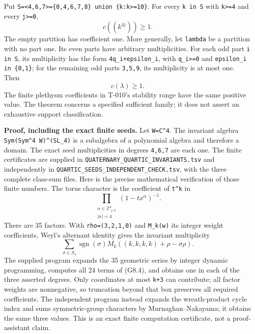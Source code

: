 \documentclass[
  10pt,
]{article}
\begin{document}
Put
\texttt{\small S=\allowbreak{}<4,\allowbreak{}6,\allowbreak{}7>=\allowbreak{}\{0,\allowbreak{}4,\allowbreak{}6,\allowbreak{}7,\allowbreak{}8\} union \{k:\allowbreak{}k>=\allowbreak{}10\}}.
For every \texttt{\small k in S} with \texttt{\small k>=\allowbreak{}4}
and every \texttt{\small j>=\allowbreak{}0}, \[
\boxed{c((k^{4j}))\ge1.}
\tag{G8.1}
\] The empty partition has coefficient one. More generally, let
\texttt{\small lambda} be a partition with no part one. Its even parts
have arbitrary multiplicities. For each odd part \texttt{\small i in S},
its multiplicity has the form
\texttt{\small 4q\_\allowbreak{}i+\allowbreak{}epsilon\_\allowbreak{}i},
with \texttt{\small q\_\allowbreak{}i>=\allowbreak{}0} and
\texttt{\small epsilon\_\allowbreak{}i in \{0,\allowbreak{}1\}}; for the
remaining odd parts \texttt{\small 3,\allowbreak{}5,\allowbreak{}9}, its
multiplicity is at most one. Then \[
\boxed{c(\lambda)\ge1.}
\tag{G8.2}
\] The finite plethysm coefficients in T-010's stability range have the
same positive value. The theorem concerns a specified sufficient family;
it does not assert an exhaustive support classification.

\textbf{Proof, including the exact finite seeds.} Let
\texttt{\small W=\allowbreak{}C\textasciicircum{}4}. The invariant
algebra
\texttt{\small Sym(\allowbreak{}Sym\textasciicircum{}4 W)\allowbreak{}\textasciicircum{}(\allowbreak{}SL\_\allowbreak{}4)\allowbreak{}}
is a subalgebra of a polynomial algebra and therefore a domain. The
exact seed multiplicities in degrees
\texttt{\small 4,\allowbreak{}6,\allowbreak{}7} are each one. The finite
certificates are supplied in
\texttt{\small QUATERNARY\_\allowbreak{}QUARTIC\_\allowbreak{}INVARIANTS.tsv}
and independently in
\texttt{\small QUARTIC\_\allowbreak{}SEEDS\_\allowbreak{}INDEPENDENT\_\allowbreak{}CHECK.tsv},
with the three complete class-sum files. Here is the precise
mathematical verification of those finite numbers. The torus character
is the coefficient of \texttt{\small t\textasciicircum{}k} in \[
\prod_{\substack{\alpha\in\mathbb Z_{\ge0}^4\\|\alpha|=4}}
(1-tx^\alpha)^{-1}.
\tag{G8.3}
\] There are 35 factors. With
\texttt{\small rho=\allowbreak{}(\allowbreak{}3,\allowbreak{}2,\allowbreak{}1,\allowbreak{}0)\allowbreak{}}
and \texttt{\small M\_\allowbreak{}k(\allowbreak{}w)\allowbreak{}} its
integer weight coefficients, Weyl's alternant identity gives the
invariant multiplicity \[
\sum_{\sigma\in S_4}\operatorname{sgn}(\sigma)
M_k((k,k,k,k)+\rho-\sigma\rho).
\tag{G8.4}
\] The supplied program expands the 35 geometric series by integer
dynamic programming, computes all 24 terms of (G8.4), and obtains one in
each of the three asserted degrees. Only coordinates at most
\texttt{\small k+\allowbreak{}3} can contribute; all factor weights are
nonnegative, so truncation beyond that box preserves all required
coefficients. The independent program instead expands the wreath-product
cycle index and sums symmetric-group characters by Murnaghan--Nakayama;
it obtains the same three values. This is an exact finite computation
certificate, not a proof-assistant claim.
\end{document}
